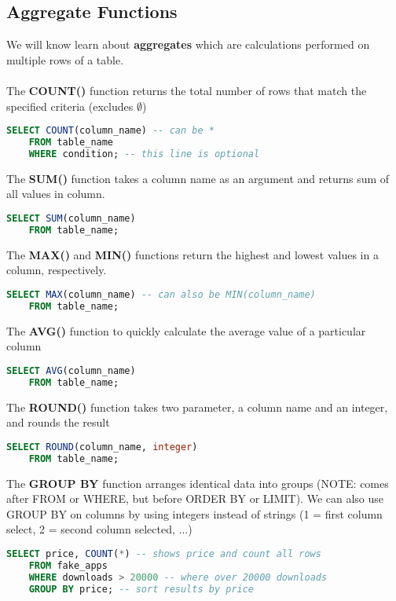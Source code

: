 \documentclass[11pt, a4paper]{article}
\begin{document}
\begin{spacing}{1.1}
	\subsection{Aggregate Functions}
	We will know learn about \textbf{aggregates} which are calculations performed on multiple rows of a table. \\~\\
	The \textbf{COUNT()} function returns the total number of rows that match the specified criteria (excludes $\emptyset$)
	\begin{lstlisting}[language=SQL]
	SELECT COUNT(column_name) -- can be *
	FROM table_name
	WHERE condition; -- this line is optional \end{lstlisting} \newpage
	\noindent The \textbf{SUM()} function takes a column name as an argument and returns sum of all values in column.
	\begin{lstlisting}[language=SQL]
	SELECT SUM(column_name)
	FROM table_name; \end{lstlisting} \vspace*{1mm}
	The \textbf{MAX()} and \textbf{MIN()} functions return the highest and lowest values in a column, respectively.
	\begin{lstlisting}[language=SQL]
	SELECT MAX(column_name) -- can also be MIN(column_name)
	FROM table_name; \end{lstlisting} \vspace*{1mm}
	The \textbf{AVG()} function to quickly calculate the average value of a particular column
	\begin{lstlisting}[language=SQL]
	SELECT AVG(column_name)
	FROM table_name; \end{lstlisting} \vspace*{1mm}
	The \textbf{ROUND()} function takes two parameter, a column name and an integer, and rounds the result
	\begin{lstlisting}[language=SQL]
	SELECT ROUND(column_name, integer)
	FROM table_name; \end{lstlisting} \vspace*{1mm}
	The \textbf{GROUP BY} function arranges identical data into groups (NOTE: comes after FROM or WHERE, but before ORDER BY or LIMIT). We can also use GROUP BY on columns by using integers instead of strings (1 = first column select, 2 = second column selected, ...)
	\begin{lstlisting}[language=SQL]
	SELECT price, COUNT(*) -- shows price and count all rows
	FROM fake_apps
	WHERE downloads > 20000 -- where over 20000 downloads
	GROUP BY price; -- sort results by price 
	

\end{lstlisting}
\end{spacing}
\end{document}
